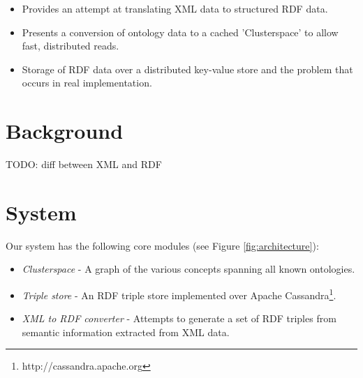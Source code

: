 \documentclass[conference]{IEEEtran}
\begin{document}
\begin{itemize}
    \item Provides an attempt at translating XML data to structured RDF data.
    \item Presents a conversion of ontology data to a cached 'Clusterspace' to
        allow fast, distributed reads.
    \item Storage of RDF data over a distributed key-value store and the
        problem that occurs in real implementation.
\end{itemize}

\section{Background}
\label{sec:background}


TODO: diff between XML and RDF

\section{System}
Our system has the following core modules (see Figure \ref{fig:architecture}):

\begin{itemize}
    \item \emph{Clusterspace} - A graph of the various concepts spanning all
        known ontologies.
    \item \emph{Triple store} - An RDF triple store implemented over Apache
        Cassandra\footnote{http://cassandra.apache.org}.
    \item \emph{XML to RDF converter} - Attempts to generate a set of RDF
        triples from semantic information extracted from XML data.
\end{itemize}
\end{document}

